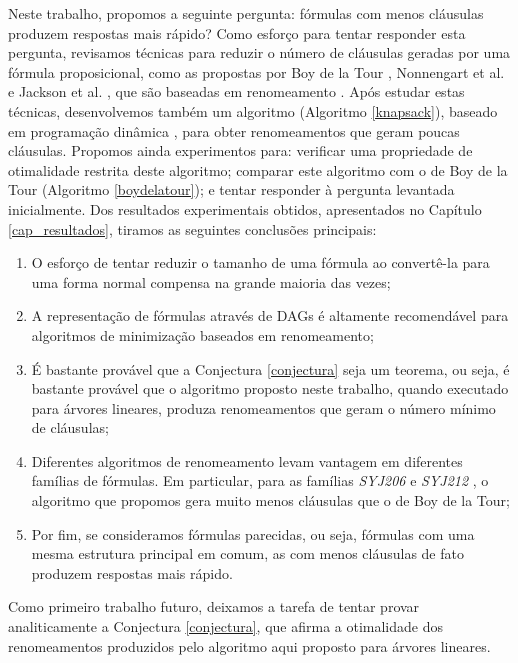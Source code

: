 
\label{cap_conclusao}

\indent

Neste trabalho, propomos a seguinte pergunta: fórmulas com menos cláusulas produzem respostas mais rápido? Como esforço para tentar responder esta pergunta, revisamos técnicas para reduzir o número de cláusulas geradas por uma fórmula proposicional, como as propostas por Boy de la Tour \cite{de1992optimality}, Nonnengart et al. \cite{nonnengart2001computing} e Jackson et al. \cite{jackson2004clause}, que são baseadas em renomeamento \cite{plaisted1986structure}. Após estudar estas técnicas, desenvolvemos também um algoritmo (Algoritmo \ref{knapsack}), baseado em programação dinâmica \cite{bellman2015applied}, para obter renomeamentos que geram poucas cláusulas. Propomos ainda experimentos para: verificar uma propriedade de otimalidade restrita deste algoritmo; comparar este algoritmo com o de Boy de la Tour (Algoritmo \ref{boydelatour}); e tentar responder à pergunta levantada inicialmente. Dos resultados experimentais obtidos, apresentados no Capítulo \ref{cap_resultados}, tiramos as seguintes conclusões principais:
\begin{enumerate}
	\item O esforço de tentar reduzir o tamanho de uma fórmula ao convertê-la para uma forma normal compensa na grande maioria das vezes;
	\item A representação de fórmulas através de DAGs é altamente recomendável para algoritmos de minimização baseados em renomeamento;
	\item É bastante provável que a Conjectura \ref{conjectura} seja um teorema, ou seja, é bastante provável que o algoritmo proposto neste trabalho, quando executado para árvores lineares, produza renomeamentos que geram o número mínimo de cláusulas;
	\item Diferentes algoritmos de renomeamento levam vantagem em diferentes famílias de fórmulas. Em particular, para as famílias \emph{SYJ206} e \emph{SYJ212} \cite{raths07jar}, o algoritmo que propomos gera muito menos cláusulas que o de Boy de la Tour;
	\item Por fim, se consideramos fórmulas parecidas, ou seja, fórmulas com uma mesma estrutura principal em comum, as com menos cláusulas de fato produzem respostas mais rápido.
\end{enumerate}

Como primeiro trabalho futuro, deixamos a tarefa de tentar provar analiticamente a Conjectura \ref{conjectura}, que afirma a otimalidade dos renomeamentos produzidos pelo algoritmo aqui proposto para árvores lineares.

